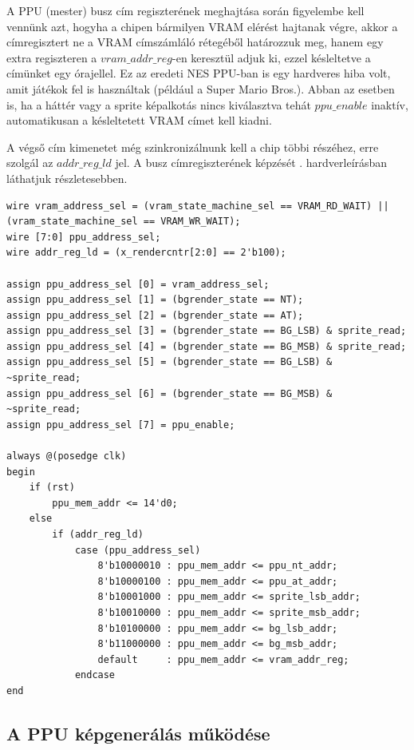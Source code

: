 	A PPU (mester) busz cím regiszterének meghajtása során figyelembe kell vennünk azt, hogyha a chipen bármilyen VRAM elérést hajtanak végre, akkor a címregisztert ne a VRAM címszámláló rétegéből határozzuk meg, hanem egy extra regiszteren a $vram\_addr\_reg$-en keresztül adjuk ki, ezzel késleltetve a címünket egy órajellel. Ez az eredeti NES PPU-ban is egy hardveres hiba volt, amit játékok fel is használtak (például a Super Mario Bros.). Abban az esetben is, ha a háttér vagy a sprite képalkotás nincs kiválasztva tehát $ppu\_enable$ inaktív, automatikusan a késleltetett VRAM címet kell kiadni. 
	
	A végső cím kimenetet még szinkronizálnunk kell a chip többi részéhez, erre szolgál az $addr\_reg\_ld$ jel. A busz címregiszterének képzését . hardverleírásban láthatjuk részletesebben.

\begin{lstlisting}[caption={PPU master adatbusz címregiszterének meghajtása és időzítése}, label={code:PPU-master-databus-addr}, style=prettyverilog]
wire vram_address_sel = (vram_state_machine_sel == VRAM_RD_WAIT) || (vram_state_machine_sel == VRAM_WR_WAIT);
wire [7:0] ppu_address_sel;
wire addr_reg_ld = (x_rendercntr[2:0] == 2'b100);

assign ppu_address_sel [0] = vram_address_sel;
assign ppu_address_sel [1] = (bgrender_state == NT);
assign ppu_address_sel [2] = (bgrender_state == AT);
assign ppu_address_sel [3] = (bgrender_state == BG_LSB) & sprite_read;
assign ppu_address_sel [4] = (bgrender_state == BG_MSB) & sprite_read;
assign ppu_address_sel [5] = (bgrender_state == BG_LSB) & ~sprite_read;
assign ppu_address_sel [6] = (bgrender_state == BG_MSB) & ~sprite_read;
assign ppu_address_sel [7] = ppu_enable;

always @(posedge clk) 
begin
	if (rst)
		ppu_mem_addr <= 14'd0;
	else
		if (addr_reg_ld)
			case (ppu_address_sel)
				8'b10000010 : ppu_mem_addr <= ppu_nt_addr;
				8'b10000100 : ppu_mem_addr <= ppu_at_addr;
				8'b10001000 : ppu_mem_addr <= sprite_lsb_addr;
				8'b10010000 : ppu_mem_addr <= sprite_msb_addr;
				8'b10100000 : ppu_mem_addr <= bg_lsb_addr;
				8'b11000000 : ppu_mem_addr <= bg_msb_addr;
				default		: ppu_mem_addr <= vram_addr_reg;
			endcase
end\end{lstlisting}

	\subsection{A PPU képgenerálás működése}
	
